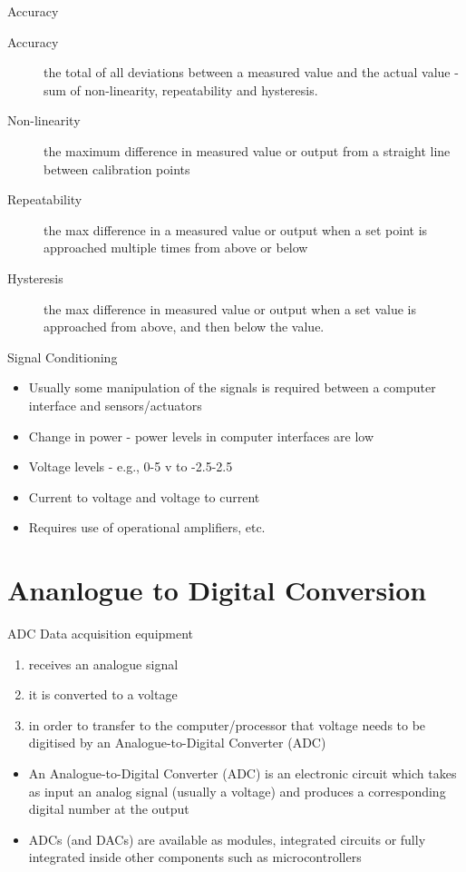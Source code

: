 \documentclass[svgnames,x11names]{beamer}
\begin{document}
\begin{frame}{Accuracy}
\begin{description}
\item[Accuracy] the total of all deviations between a measured
value and the actual value - sum of non-linearity,
repeatability and hysteresis.
\item[Non-linearity] the maximum difference in measured value
or output from a straight line between calibration points
\item[Repeatability] the max difference in a measured value or
output when a set point is approached multiple times from
above or below
\item[Hysteresis] the max difference in measured value or
output when a set value is approached from above, and then
below the value.
\end{description}
\end{frame}

\begin{frame}{Signal Conditioning}
\begin{itemize}
\item Usually some manipulation of the signals is
required between a computer interface and
sensors/actuators
\item Change in power - power levels in computer
interfaces are low
\item Voltage levels - e.g., 0-5 v to -2.5-2.5
\item Current to voltage and voltage to current
\item Requires use of operational amplifiers, etc.
\end{itemize}
\end{frame}

\part{Ananlogue to Digital Conversion}
\frame\partpage

\begin{frame}{ADC}
{Data acquisition equipment}
  \begin{enumerate}
  \item receives an analogue signal
   
    
  \item it is converted to a voltage

    
  \item in order to transfer to the computer/processor that voltage needs
    to be \alert{digitised} by an Analogue-to-Digital Converter (ADC)
  \end{enumerate}

  \begin{itemize}
  \item An Analogue-to-Digital Converter (ADC) is an
electronic circuit which takes as input an analog
signal (usually a voltage) and produces a
corresponding digital number at the output
\item  ADCs (and DACs) are available as modules,
integrated circuits or fully integrated inside other
components such as microcontrollers 
  \end{itemize}
\end{frame}
\end{document}

